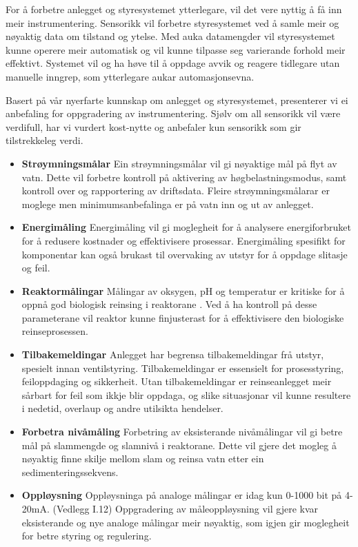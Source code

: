 For å forbetre anlegget og styresystemet ytterlegare, vil det vere nyttig å få inn meir instrumentering. 
Sensorikk vil forbetre styresystemet ved å samle meir og nøyaktig data om tilstand og ytelse. 
Med auka datamengder vil styresystemet kunne operere meir automatisk og vil kunne tilpasse seg varierande forhold meir effektivt. 
Systemet vil og ha høve til å oppdage avvik og reagere tidlegare utan manuelle inngrep, som ytterlegare aukar automasjonsevna.

Basert på vår nyerfarte kunnskap om anlegget og styresystemet, presenterer vi ei
anbefaling for oppgradering av instrumentering. 
Sjølv om all sensorikk vil være verdifull, har vi vurdert kost-nytte og anbefaler kun sensorikk som gir tilstrekkeleg verdi.


\begin{itemize}
    \item \textbf{Strøymningsmålar} \newline
        Ein strøymningsmålar vil gi nøyaktige mål på flyt av vatn.
        Dette vil forbetre kontroll på aktivering av høgbelastningsmodus, samt kontroll over og rapportering av driftsdata.
        Fleire strøymningsmålarar er moglege men minimumsanbefalinga er på vatn inn og ut av anlegget.
    \item \textbf{Energimåling} \newline
        Energimåling vil gi moglegheit for å analysere energiforbruket for å redusere kostnader og effektivisere prosessar.
        Energimåling spesifikt for komponentar kan også brukast til overvaking av utstyr for å oppdage slitasje og feil.
    \item \textbf{Reaktormålingar} \newline
        Målingar av oksygen, pH og temperatur er kritiske for å oppnå god biologisk reinsing i reaktorane \citep{SNL_PH}. \newline
        Ved å ha kontroll på desse parameterane vil reaktor kunne finjusterast for å effektivisere den biologiske reinseprosessen.
    \item \textbf{Tilbakemeldingar} \newline
        Anlegget har begrensa tilbakemeldingar frå utstyr, spesielt innan ventilstyring.
        Tilbakemeldingar er essensielt for prosesstyring, feiloppdaging og sikkerheit.
        Utan tilbakemeldingar er reinseanlegget meir sårbart for feil som ikkje blir oppdaga, 
        og slike situasjonar vil kunne resultere i nedetid, overlaup og andre utilsikta hendelser.
    \item \textbf{Forbetra nivåmåling} \newline
        Forbetring av eksisterande nivåmålingar vil gi betre mål på slammengde og slamnivå i reaktorane.
        Dette vil gjere det mogleg å nøyaktig finne skilje mellom slam og reinsa vatn etter ein sedimenteringssekvens.
    \item \textbf{Oppløysning} \newline
        Oppløysninga på analoge målingar er idag kun 0-1000 bit på 4-20mA. (Vedlegg I.12)\newline
        Oppgradering av måleoppløysning vil gjere kvar eksisterande og nye analoge målingar
        meir nøyaktig, som igjen gir moglegheit for betre styring og regulering.
\end{itemize}
\newpage


